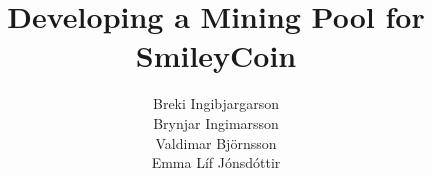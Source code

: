 \documentclass[table,11pt]{article}
\begin{document}
\title{Developing a Mining Pool for SmileyCoin}
\author{Breki Ingibjargarson\\ Brynjar Ingimarsson\\ Valdimar Björnsson\\ Emma Líf Jónsdóttir}
\maketitle

\setcounter{tocdepth}{2}
\setcounter{secnumdepth}{2}
\tableofcontents





\end{document}
